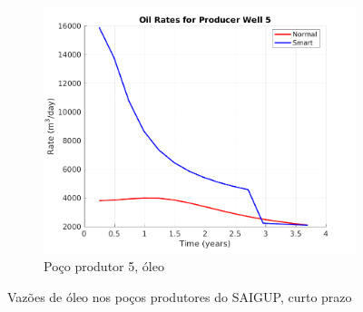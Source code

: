 \begin{figure}[!ht]
	\begin{subfigure}[b]{.45\textwidth}
		\includegraphics[width=\textwidth]{figs/resultadosSSAIGUP/SSAIGUP_OilWell5_Zoom}
		\caption{Po\c{c}o produtor 5, \'{o}leo}
		\label{SSAIGUP_OilWell5}
	\end{subfigure}
\caption{Vaz\~{o}es de \'{o}leo nos po\c{c}os produtores do SAIGUP, curto prazo}
\label{SSAIGUP_OilRates}
\end{figure}

